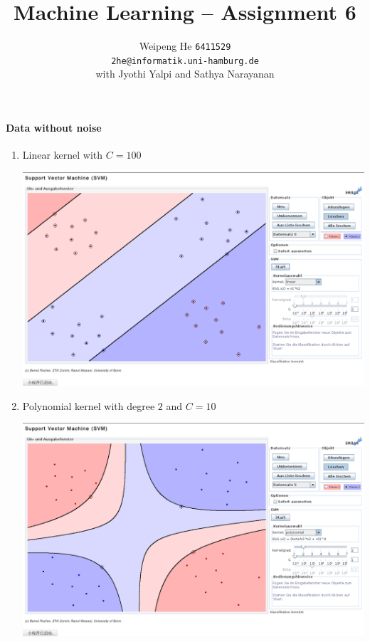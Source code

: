 \documentclass{article}[11pt]
\title{Machine Learning -- Assignment 6}
\author{Weipeng He \texttt{6411529} \\ \texttt{2he@informatik.uni-hamburg.de}  \\ with Jyothi Yalpi and Sathya Narayanan}
\begin{document}
\maketitle

\section{}
\paragraph{Data without noise}
\begin{enumerate}
\item 
Linear kernel with $C=100$
\begin{center}
  \includegraphics[width=.9\textwidth]{a-lin-c2}
\end{center}

\item 
Polynomial kernel with degree $2$ and $C=10$
\begin{center}
  \includegraphics[width=.9\textwidth]{a-poly2-c1}
\end{center}


\end{enumerate}
\end{document}
